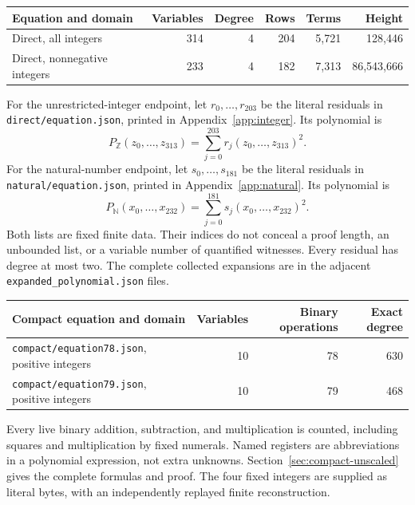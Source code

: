 \documentclass[11pt,a4paper]{article}
\theoremstyle{remark}\newtheorem{remark}[theorem]{Remark}
\newcommand{\N}{\mathbb N}
\newcommand{\Z}{\mathbb Z}
\newcommand{\code}[1]{\nolinkurl{#1}}
\begin{document}
\begin{center}\small
\begin{tabular}{@{}lrrrrr@{}}
\toprule
Equation and domain & Variables & Degree & Rows & Terms & Height\\
\midrule
Direct, all integers &314&4&204&5,721&128,446\\
Direct, nonnegative integers &233&4&182&7,313&86,543,666\\
\bottomrule
\end{tabular}
\end{center}

For the unrestricted-integer endpoint, let \(r_0,\ldots,r_{203}\) be
the literal residuals in \code{direct/equation.json}, printed in
Appendix~\ref{app:integer}. Its polynomial is
\begin{equation}\label{eq:integer-main}
 P_{\Z}(z_0,\ldots,z_{313})=
 \sum_{j=0}^{203}r_j(z_0,\ldots,z_{313})^2.
\end{equation}
For the natural-number endpoint, let \(s_0,\ldots,s_{181}\) be the
literal residuals in \code{natural/equation.json}, printed in
Appendix~\ref{app:natural}. Its polynomial is
\begin{equation}\label{eq:natural-main}
 P_{\N}(x_0,\ldots,x_{232})=
 \sum_{j=0}^{181}s_j(x_0,\ldots,x_{232})^2.
\end{equation}
Both lists are fixed finite data. Their indices do not conceal a proof
length, an unbounded list, or a variable number of quantified witnesses.
Every residual has degree at most two. The complete collected expansions
are in the adjacent \code{expanded_polynomial.json} files.

\begin{center}\small
\begin{tabular}{@{}lrrr@{}}
\toprule
Compact equation and domain & Variables & Binary operations & Exact degree\\
\midrule
\code{compact/equation78.json}, positive integers &10&78&630\\
\code{compact/equation79.json}, positive integers &10&79&468\\
\bottomrule
\end{tabular}
\end{center}
Every live binary addition, subtraction, and multiplication is counted,
including squares and multiplication by fixed numerals. Named registers
are abbreviations in a polynomial expression, not extra unknowns.
Section~\ref{sec:compact-unscaled} gives the
complete formulas and proof. The four fixed integers are supplied as
literal bytes, with an independently replayed finite reconstruction.
\end{document}
